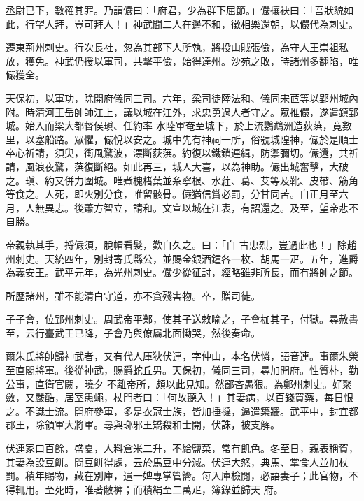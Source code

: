 \begin{pinyinscope}
 丞尉已下，數罹其罪。乃謂儼曰：「府君，少為群下屈節。」儼攘袂曰：「吾狀貌如此，行望人拜，豈可拜人！」神武聞二人在邊不和，徵相樂還朝，以儼代為刺史。



 遷東荊州刺史。行次長社，忽為其部下人所執，將投山賊張儉，為守人王崇祖私放，獲免。神武仍授以軍司，共擊平儉，始得達州。沙苑之敗，時諸州多翻陷，唯儼獲全。



 天保初，以軍功，除開府儀同三司。六年，梁司徒陸法和、儀同宋茝等以郢州城內附。時清河王岳帥師江上，議以城在江外，求忠勇過人者守之。眾推儼，遂遣鎮郢城。始入而梁大都督侯瑱、任約率
 水陸軍奄至城下，於上流鸚鵡洲造荻葓，竟數里，以塞船路。眾懼，儼悅以安之。城中先有神祠一所，俗號城隍神，儼於是順士卒心祈請，須臾，衝風驚波，漂斷荻葓。約復以鐵鎖連緝，防禦彌切。儼還，共祈請，風浪夜驚，葓復斷絕。如此再三，城人大喜，以為神助。儼出城奮擊，大破之。瑱、約又併力圍城。唯煮槐楮葉並糸寧根、水葒、葛、艾等及靴、皮帶、筋角等食之。人死，即火別分食，唯留骸骨。儼猶信賞必罰，分甘同苦。自正月至六月，人無異志。後蕭方智立，請和。文宣以城在江表，有詔還之。及至，望帝悲不自勝。



 帝親執其手，捋儼須，脫帽看髮，歎自久之。曰：「自
 古忠烈，豈過此也！」除趙州刺史。天統四年，別封寄氏縣公，並賜金銀酒鐘各一枚、胡馬一疋。五年，進爵為義安王。武平元年，為光州刺史。儼少從征討，經略雖非所長，而有將帥之節。



 所歷諸州，雖不能清白守道，亦不貪殘害物。卒，贈司徒。



 子子會，位郢州刺史。周武帝平鄴，使其子送敕喻之，子會枷其子，付獄。尋赦書至，云行臺武王已降，子會乃與僚屬北面慟哭，然後奏命。



 爾朱氏將帥歸神武者，又有代人厙狄伏連，字仲山，本名伏憐，語音連。事爾朱榮至直閣將軍。後從神武，賜爵蛇丘男。天保初，儀同三司，尋加開府。性質朴，勤公事，直衛官闕，曉夕
 不離帝所，頗以此見知。然鄙吝愚狠。為鄭州刺史。好聚斂，又嚴酷，居室患蠅，杖門者曰：「何故聽入！」其妻病，以百錢買藥，每日恨之。不識士流。開府參軍，多是衣冠士族，皆加捶撻，逼遣築牆。武平中，封宜都郡王，除領軍大將軍。尋與瑯邪王矯殺和士開，伏誅，被支解。



 伏連家口百餘，盛夏，人料倉米二升，不給鹽菜，常有飢色。冬至日，親表稱賀，其妻為設豆餅。問豆餅得處，云於馬豆中分減。伏連大怒，典馬、掌食人並加杖罰。積年賜物，藏在別庫，遣一婢專掌管籥。每入庫檢閱，必語妻子；此官物，不得輒用。至死時，唯著敝褲；而積絹至二萬疋，簿錄並歸天
 府。




\end{pinyinscope}
